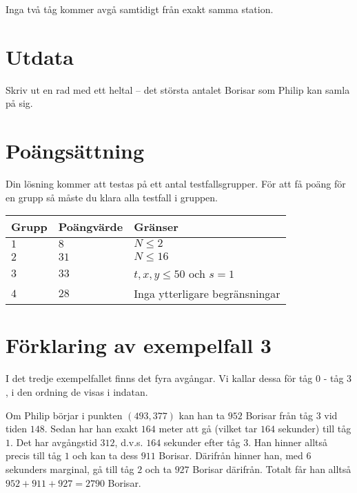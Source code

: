 Inga två tåg kommer avgå samtidigt från exakt samma station.

\section*{Utdata}
Skriv ut en rad med ett heltal -- det största antalet Borisar som Philip kan samla på sig.

\section*{Poängsättning}
Din lösning kommer att testas på ett antal testfallsgrupper.
För att få poäng för en grupp så måste du klara alla testfall i gruppen.

\noindent
\begin{tabular}{| l | l | l |}
  \hline
  Grupp & Poängvärde & Gränser \\ \hline
  $1$   & $8$        & $N \le 2$ \\ \hline
  $2$   & $31$       & $N \le 16$ \\ \hline
  $3$   & $33$       & $t,x,y\le 50$ och $s = 1$ \\ \hline
  $4$   & $28$       & Inga ytterligare begränsningar \\ \hline
\end{tabular}

\section*{Förklaring av exempelfall 3}
I det tredje exempelfallet finns det fyra avgångar.
Vi kallar dessa för tåg $0$ - tåg $3$, i den ordning de visas i indatan.

Om Philip börjar i punkten $(493,377)$ kan han ta $952$ Borisar från tåg $3$ vid tiden $148$. Sedan har han exakt $164$ meter att gå (vilket tar $164$ sekunder) till tåg $1$. Det har avgångstid $312$, d.v.s. $164$ sekunder efter tåg $3$. 
Han hinner alltså precis till tåg $1$ och kan ta dess $911$ Borisar. Därifrån hinner han, med $6$ sekunders marginal, gå till tåg $2$ och ta $927$ Borisar därifrån. Totalt får han alltså $952+911+927=2790$ Borisar. 
